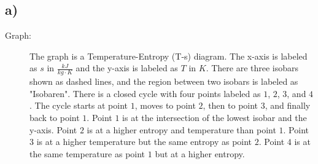 

\subsection*{a)}

\begin{description}
    \item[Graph:] The graph is a Temperature-Entropy (T-s) diagram. The x-axis is labeled as $s$ in $\frac{kJ}{kg \cdot K}$ and the y-axis is labeled as $T$ in $K$. There are three isobars shown as dashed lines, and the region between two isobars is labeled as "Isobaren". There is a closed cycle with four points labeled as $1$, $2$, $3$, and $4$. The cycle starts at point $1$, moves to point $2$, then to point $3$, and finally back to point $1$. Point $1$ is at the intersection of the lowest isobar and the y-axis. Point $2$ is at a higher entropy and temperature than point $1$. Point $3$ is at a higher temperature but the same entropy as point $2$. Point $4$ is at the same temperature as point $1$ but at a higher entropy.
\end{description}